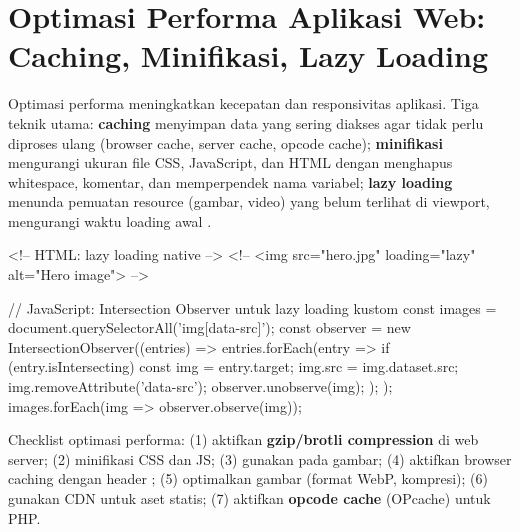 \section{Optimasi Performa Aplikasi Web: Caching, Minifikasi, Lazy Loading}

Optimasi performa meningkatkan kecepatan dan responsivitas aplikasi. Tiga teknik utama: \textbf{caching} menyimpan data yang sering diakses agar tidak perlu diproses ulang (browser cache, server cache, opcode cache); \textbf{minifikasi} mengurangi ukuran file CSS, JavaScript, dan HTML dengan menghapus whitespace, komentar, dan memperpendek nama variabel; \textbf{lazy loading} menunda pemuatan resource (gambar, video) yang belum terlihat di viewport, mengurangi waktu loading awal \cite{mdnToolsTesting}.

\begin{webcode}[language=JavaScript, caption={Lazy loading gambar dengan atribut HTML dan Intersection Observer}]
<!-- HTML: lazy loading native -->
<!-- <img src="hero.jpg" loading="lazy" alt="Hero image"> -->

// JavaScript: Intersection Observer untuk lazy loading kustom
const images = document.querySelectorAll('img[data-src]');
const observer = new IntersectionObserver((entries) => {
  entries.forEach(entry => {
    if (entry.isIntersecting) {
      const img = entry.target;
      img.src = img.dataset.src;
      img.removeAttribute('data-src');
      observer.unobserve(img);
    }
  });
});
images.forEach(img => observer.observe(img));
\end{webcode}

\begin{catatan}
Checklist optimasi performa: (1) aktifkan \textbf{gzip/brotli compression} di web server; (2) minifikasi CSS dan JS; (3) gunakan  pada gambar; (4) aktifkan browser caching dengan header ; (5) optimalkan gambar (format WebP, kompresi); (6) gunakan CDN untuk aset statis; (7) aktifkan \textbf{opcode cache} (OPcache) untuk PHP.
\end{catatan}

